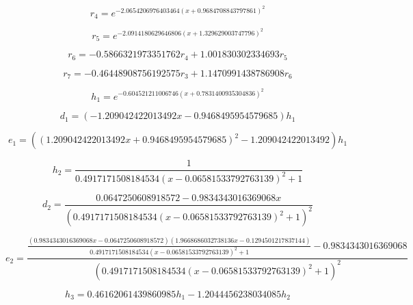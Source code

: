 \begin{equation}
r_{4}=e^{- 2.0654206976403464 \left(x + 0.9684708843797861\right)^{2}}
\end{equation}


\begin{equation}
r_{5}=e^{- 2.0914180629646806 \left(x + 1.329629003747796\right)^{2}}
\end{equation}


\begin{equation}
r_{6}=- 0.5866321973351762 r_{4} + 1.001830302334693 r_{5}
\end{equation}


\begin{equation}
r_{7}=- 0.46448908756192575 r_{3} + 1.1470991438786908 r_{6}
\end{equation}


\begin{equation}
h_{1}=e^{- 0.604521211006746 \left(x + 0.7831400935304836\right)^{2}}
\end{equation}


\begin{equation}
d_{1}=\left(- 1.209042422013492 x - 0.9468495954579685\right) h_{1}
\end{equation}


\begin{equation}
e_{1}=\left(\left(1.209042422013492 x + 0.9468495954579685\right)^{2} - 1.209042422013492\right) h_{1}
\end{equation}


\begin{equation}
h_{2}=\frac{1}{0.4917171508184534 \left(x - 0.06581533792763139\right)^{2} + 1}
\end{equation}


\begin{equation}
d_{2}=\frac{0.0647250608918572 - 0.9834343016369068 x}{\left(0.4917171508184534 \left(x - 0.06581533792763139\right)^{2} + 1\right)^{2}}
\end{equation}


\begin{equation}
e_{2}=\frac{\frac{\left(0.9834343016369068 x - 0.0647250608918572\right) \left(1.9668686032738136 x - 0.1294501217837144\right)}{0.4917171508184534 \left(x - 0.06581533792763139\right)^{2} + 1} - 0.9834343016369068}{\left(0.4917171508184534 \left(x - 0.06581533792763139\right)^{2} + 1\right)^{2}}
\end{equation}


\begin{equation}
h_{3}=0.46162061439860985 h_{1} - 1.2044456238034085 h_{2}
\end{equation}


